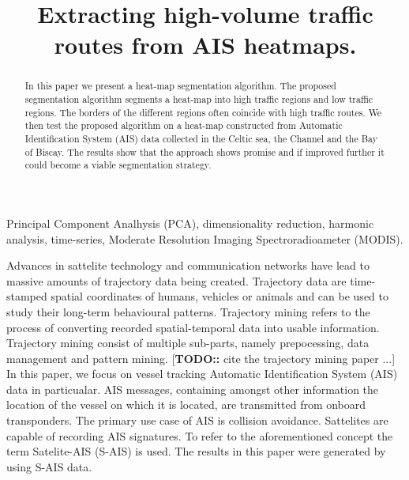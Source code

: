 \documentclass{article}
\title{Extracting high-volume traffic routes from AIS heatmaps.}
\begin{document}
%
\maketitle
%
\begin{abstract}
In this paper we present a heat-map segmentation algorithm. The proposed segmentation algorithm
segments a heat-map into high traffic regions and low traffic regions. The borders of the different regions often coincide with high traffic routes. We then test the proposed 
algorithm on a heat-map constructed from Automatic Identification System (AIS) data collected in the Celtic sea, the Channel and the Bay of Biscay. The results show that the approach shows promise and if improved further 
it could become a viable segmentation strategy.
\end{abstract}
%
\begin{keywords}
Principal Component Analhysis (PCA), dimensionality reduction, harmonic analysis, time-series, Moderate Resolution Imaging Spectroradioameter (MODIS).
\end{keywords}
\begin{abstract}
\end{abstract}
Advances in sattelite technology and communication networks have lead to massive amounts of trajectory data being created. 
Trajectory data are time-stamped spatial coordinates of humans, vehicles or animals and can be used to study their long-term behavioural patterns.
Trajectory mining refers to the process of converting recorded spatial-temporal data into usable information. Trajectory mining consist of multiple sub-parts, namely 
prepocessing, data management and pattern mining.  [\textbf{TODO::} cite the trajectory mining paper ...] 
In this paper, we focus on vessel tracking Automatic Identification System (AIS) data in particualar. AIS messages, containing amongst other information the location of the vessel on which it is located, are transmitted from onboard transponders. The primary use case of 
AIS is collision avoidance. Sattelites are capable of recording AIS signatures. To refer to the aforementioned concept the term Satelite-AIS (S-AIS) is used. The results in 
this paper were generated by using S-AIS data.
\end{document}

